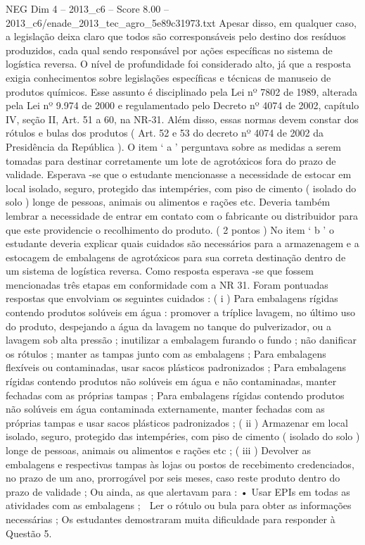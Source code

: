 \begin{textsample}{NEG Dim 4 – 2013\_c6 – Score 8.00 – 2013\_c6/enade\_2013\_tec\_agro\_5e89c31973.txt}
Apesar disso, em qualquer caso, a legislação deixa claro que todos são corresponsáveis pelo destino dos resíduos produzidos, cada qual sendo responsável por ações específicas no sistema de logística reversa.
O nível de profundidade foi considerado alto, já que a resposta exigia conhecimentos sobre legislações específicas e técnicas de manuseio de produtos químicos.
Esse assunto é disciplinado pela Lei nº 7802 de 1989, alterada pela Lei nº 9.974 de 2000 e regulamentado pelo Decreto nº 4074 de 2002, capítulo IV, seção II, Art. 51 a 60, na NR-31.
Além disso, essas normas devem constar dos rótulos e bulas dos produtos ( Art. 52 e 53 do decreto nº 4074 de 2002 da Presidência da República ).
O item ‘ a ’ perguntava sobre as medidas a serem tomadas para destinar corretamente um lote de agrotóxicos fora do prazo de validade.
Esperava -se que o estudante mencionasse a necessidade de estocar em local isolado, seguro, protegido das intempéries, com piso de cimento ( isolado do solo ) longe de pessoas, animais ou alimentos e rações etc.
Deveria também lembrar a necessidade de entrar em contato com o fabricante ou distribuidor para que este providencie o recolhimento do produto. ( 2 pontos ) No item ‘ b ’ o estudante deveria explicar quais cuidados são necessários para a armazenagem e a estocagem de embalagens de agrotóxicos para sua correta destinação dentro de um sistema de logística reversa.
Como resposta esperava -se que fossem mencionadas três etapas em conformidade com a NR 31.
Foram pontuadas respostas que envolviam os seguintes cuidados : ( i ) Para embalagens rígidas contendo produtos solúveis em água : promover a tríplice lavagem, no último uso do produto, despejando a água da lavagem no tanque do pulverizador, ou a lavagem sob alta pressão ; inutilizar a embalagem furando o fundo ; não danificar os rótulos ; manter as tampas junto com as embalagens ; Para embalagens flexíveis ou contaminadas, usar sacos plásticos padronizados ; Para embalagens rígidas contendo produtos não solúveis em água e não contaminadas, manter fechadas com as próprias tampas ; Para embalagens rígidas contendo produtos não solúveis em água contaminada externamente, manter fechadas com as próprias tampas e usar sacos plásticos padronizados ; ( ii ) Armazenar em local isolado, seguro, protegido das intempéries, com piso de cimento ( isolado do solo ) longe de pessoas, animais ou alimentos e rações etc ; ( iii ) Devolver as embalagens e respectivas tampas às lojas ou postos de recebimento credenciados, no prazo de um ano, prorrogável por seis meses, caso reste produto dentro do prazo de validade ; Ou ainda, as que alertavam para : • Usar EPIs em todas as atividades com as embalagens ;  Ler o rótulo ou bula para obter as informações necessárias ; Os estudantes demostraram muita dificuldade para responder à Questão 5.

\end{textsample}
